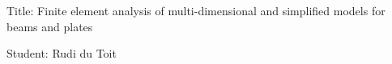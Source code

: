 \documentclass[12pt]{report}
\begin{document}
Title: Finite element analysis of multi-dimensional and simplified models for beams and plates

Student: Rudi du Toit
\end{document}

